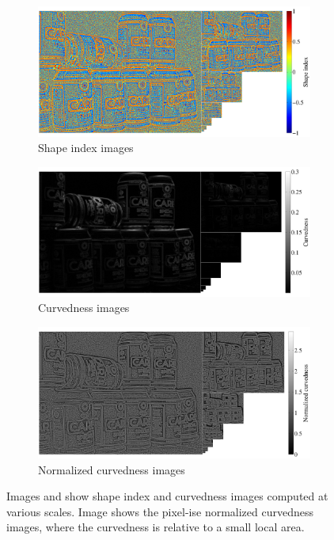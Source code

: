\documentclass[thesis.tex]{subfiles}
\begin{document}
\begin{figure}[p]
    \centering
    \begin{subfigure}[t]{0.97\textwidth}
		\includegraphics[width=\textwidth]{img/cellHistScaleSpacesS.pdf}
    	\caption{Shape index images}
    	\label{fig:cellHistScaleSpacesS}
	\end{subfigure}
    \begin{subfigure}[t]{0.97\textwidth}
		\includegraphics[width=\textwidth]{img/cellHistScaleSpacesC.pdf}
    	\caption{Curvedness images}
    	\label{fig:cellHistScaleSpacesC}
	\end{subfigure}
	\begin{subfigure}[t]{0.97\textwidth}
		\includegraphics[width=\textwidth]{img/cellHistScaleSpacesCnorm.pdf}
    	\caption{Normalized curvedness images}
    	\label{fig:cellHistScaleSpacesCnorm}
	\end{subfigure}
	\caption{Images  and  show shape index and curvedness images computed at various scales. Image  shows the pixel-ise normalized curvedness images, where the curvedness is relative to a small local area.}
	\label{fig:cellHistScaleSpacesSC}
\end{figure}
\end{document}
